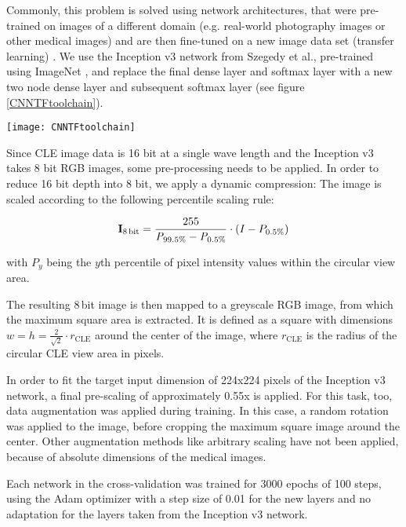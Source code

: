 \documentclass[fleqn,10pt]{wlscirep}
\begin{document}
Commonly, this problem is solved using network architectures, that were pre-trained on images of a different domain (e.g. real-world photography images or other medical images) and are then fine-tuned on a new image data set (transfer learning) \cite{Shin:cx,Esteva:2017ct}. We use the Inception v3 network from Szegedy et al.\cite{Szegedy:2016cv}, pre-trained using ImageNet \cite{imagenet_cvpr09}, and replace the final dense layer and softmax layer with a new two node dense layer and subsequent softmax layer (see figure \ref{CNNTFtoolchain}).

\begin{figure*}[!t]
\centering
\texttt{[image: CNNTFtoolchain]}
\hfil
\caption{Overview of the transfer learning approach, based on Szegedy's Inception v3 \cite{Szegedy:2016cv}, pre-trained on the ImageNet database \cite{imagenet_cvpr09} }
\label{CNNTFtoolchain}
\end{figure*}

Since CLE image data is 16 bit at a single wave length and the Inception v3 takes 8 bit RGB images, some pre-processing needs to be applied.
In order to reduce 16 bit depth into 8 bit, we apply a dynamic compression: The image is scaled according to the following percentile scaling rule:

$$ \mathbf{I}_\textrm{8\,bit} = \frac{255}{\mathit{P}_{99.5\%} - \mathit{P}_{0.5\%}} \cdot (I-P_{0.5\%})$$

with $\mathit{P}_y$ being the $y$th percentile of pixel intensity values within the circular view area.

The resulting 8\,bit image is then mapped to a greyscale RGB image, from which the maximum square area is extracted. It is defined as a square with dimensions $w=h=\frac{2}{\sqrt{2}} \cdot r_\mathrm{CLE}$ around the
center of the image, where
$r_\mathrm{CLE}$ is the radius of the circular CLE view area in pixels.

In order to fit the target input dimension of 224x224 pixels of the Inception v3 network, a final pre-scaling of approximately 0.55x is applied. For this task, too, data augmentation was applied during training. In this case, a random rotation was applied to the image, before cropping the maximum square image around the center. Other augmentation methods like arbitrary scaling have not been applied, because of absolute dimensions of the medical images.

Each network in the cross-validation was trained for 3000 epochs of 100 steps, using the Adam optimizer with a step size of 0.01 for the new layers and no adaptation for the layers taken from the Inception v3 network.
\end{document}

